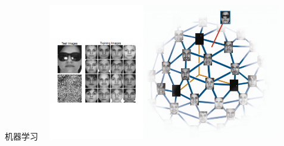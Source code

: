 \documentclass[slidestop, compress, mathserif, UTF8]{beamer}
\numberwithin{equation}{section}                                        %
\begin{document}
			\begin{frame}[t]{机器学习}
				\vspace{0.5cm}
				\centering
					\includegraphics[width=11cm,height=6cm]{src//6.jpg}
			\end{frame}
\end{document}
